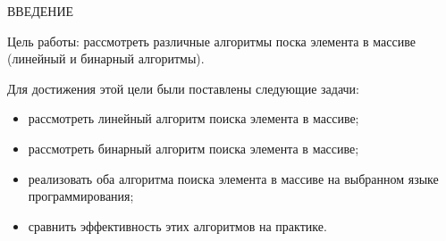 \begin{center}
    \MakeUppercase{\large Введение}
\end{center}

Цель работы: рассмотреть различные алгоритмы поска элемента в массиве (линейный и бинарный алгоритмы).

\vspace{0.25cm}
Для достижения этой цели были поставлены следующие задачи:

\begin{itemize}

\item рассмотреть линейный алгоритм поиска элемента в массиве;

\item рассмотреть бинарный алгоритм поиска элемента в массиве;

\item реализовать оба алгоритма поиска элемента в массиве на выбранном языке программирования;

\item сравнить эффективность этих алгоритмов на практике.

\end{itemize}

\newpage